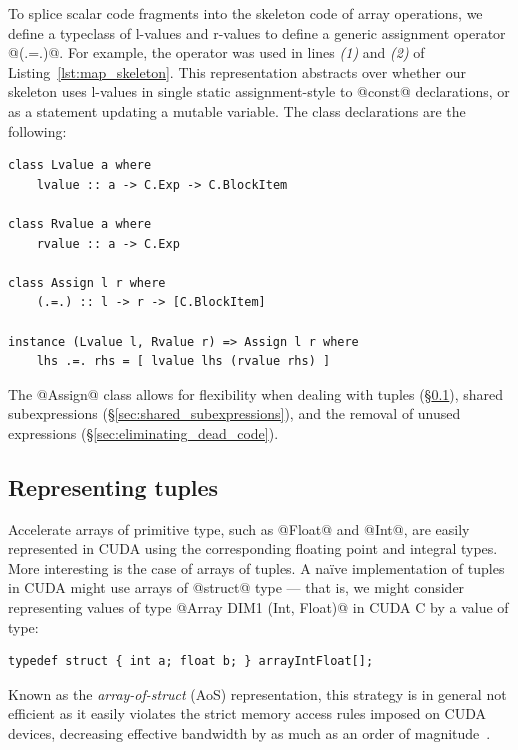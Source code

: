To splice scalar code fragments into the skeleton code of array operations, we
define a typeclass of l-values and r-values to define a generic assignment
operator @(.=.)@. For example, the operator was used in lines \emph{(1)}
and \emph{(2)} of Listing~\ref{lst:map_skeleton}. This representation abstracts
over whether our skeleton uses l-values in single static assignment-style to
@const@ declarations, or as a statement updating a mutable variable. The
class declarations are the following:
%
\begin{lstlisting}[style=haskell]
class Lvalue a where
    lvalue :: a -> C.Exp -> C.BlockItem

class Rvalue a where
    rvalue :: a -> C.Exp

class Assign l r where
    (.=.) :: l -> r -> [C.BlockItem]

instance (Lvalue l, Rvalue r) => Assign l r where
    lhs .=. rhs = [ lvalue lhs (rvalue rhs) ]
\end{lstlisting}

The @Assign@ class allows for flexibility when dealing with tuples
(\S\ref{sec:representing_tuples}), shared subexpressions
(\S\ref{sec:shared_subexpressions}), and the removal of unused expressions
(\S\ref{sec:eliminating_dead_code}).


\skeleton[|)]{}


\subsection{Representing tuples}
\label{sec:representing_tuples}

\cg[tuples|(]{}

Accelerate arrays of primitive type, such as @Float@ and @Int@, are
easily represented in CUDA using the corresponding floating point and integral
types. More interesting is the case of arrays of tuples. A na\"ive
implementation of tuples in CUDA might use arrays of @struct@ type --- that
is, we might consider representing values of type @Array DIM1 (Int, Float)@
in CUDA C by a value of type:
%
\begin{lstlisting}[style=cuda]
typedef struct { int a; float b; } arrayIntFloat[];
\end{lstlisting}
%
Known as the \emph{array-of-struct} (AoS)
representation, this strategy is in general not efficient as it easily violates
the strict memory access rules imposed on CUDA devices, decreasing effective
bandwidth by as much as an order of magnitude~\cite{NVIDIA:2012wf}.

